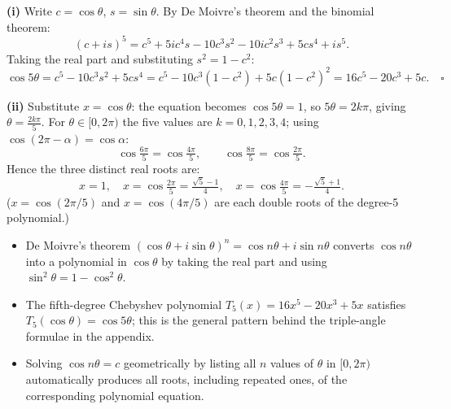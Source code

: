 \begin{solution}

\textbf{(i)} Write $c=\cos\theta$, $s=\sin\theta$. By De Moivre's theorem and the binomial theorem:
\[
(c+is)^5 = c^5+5ic^4s-10c^3s^2-10ic^2s^3+5cs^4+is^5.
\]
Taking the real part and substituting $s^2=1-c^2$:
\[
\cos 5\theta = c^5-10c^3s^2+5cs^4
= c^5-10c^3(1-c^2)+5c(1-c^2)^2
= 16c^5-20c^3+5c. \quad\square
\]

\textbf{(ii)} Substitute $x=\cos\theta$: the equation becomes $\cos5\theta=1$, so
$5\theta=2k\pi$, giving $\theta=\tfrac{2k\pi}{5}$.
For $\theta\in[0,2\pi)$ the five values are $k=0,1,2,3,4$; using $\cos(2\pi-\alpha)=\cos\alpha$:
\[
\cos\tfrac{6\pi}{5}=\cos\tfrac{4\pi}{5},\qquad \cos\tfrac{8\pi}{5}=\cos\tfrac{2\pi}{5}.
\]
Hence the three distinct real roots are:
\[
\boxed{x=1,\quad x=\cos\!\tfrac{2\pi}{5}=\tfrac{\sqrt{5}-1}{4},\quad x=\cos\!\tfrac{4\pi}{5}=-\tfrac{\sqrt{5}+1}{4}.}
\]
($x=\cos(2\pi/5)$ and $x=\cos(4\pi/5)$ are each double roots of the degree-5 polynomial.)

\end{solution}

\begin{takeaways}
\begin{itemize}[leftmargin=*]
  \item De Moivre's theorem $(\cos\theta + i\sin\theta)^n = \cos n\theta + i\sin n\theta$
        converts $\cos n\theta$ into a polynomial in $\cos\theta$ by taking the real part and
        using $\sin^2\theta = 1 - \cos^2\theta$.
  \item The fifth-degree Chebyshev polynomial $T_5(x) = 16x^5 - 20x^3 + 5x$ satisfies
        $T_5(\cos\theta) = \cos 5\theta$; this is the general pattern behind the triple-angle
        formulae in the appendix.
  \item Solving $\cos n\theta = c$ geometrically by listing all $n$ values of $\theta$ in
        $[0, 2\pi)$ automatically produces all roots, including repeated ones, of the
        corresponding polynomial equation.
\end{itemize}
\end{takeaways}

